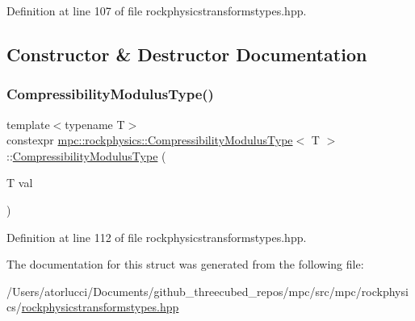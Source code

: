 Definition at line 107 of file rockphysicstransformstypes.\+hpp.



\subsection{Constructor \& Destructor Documentation}
\mbox{\label{structmpc_1_1rockphysics_1_1_compressibility_modulus_type_a7a8f465566c3f05f6bd9f24491680768}} 
\subsubsection{\texorpdfstring{Compressibility\+Modulus\+Type()}{CompressibilityModulusType()}}
{\footnotesize\ttfamily template$<$typename T$>$ \\
constexpr \mbox{\hyperlink{structmpc_1_1rockphysics_1_1_compressibility_modulus_type}{mpc\+::rockphysics\+::\+Compressibility\+Modulus\+Type}}$<$ T $>$\+::\mbox{\hyperlink{structmpc_1_1rockphysics_1_1_compressibility_modulus_type}{Compressibility\+Modulus\+Type}} (\begin{DoxyParamCaption}\item[{T}]{val }\end{DoxyParamCaption})\hspace{0.3cm}{\ttfamily [inline]}}



Definition at line 112 of file rockphysicstransformstypes.\+hpp.



The documentation for this struct was generated from the following file\+:\begin{DoxyCompactItemize}
\item 
/\+Users/atorlucci/\+Documents/github\+\_\+threecubed\+\_\+repos/mpc/src/mpc/rockphysics/\mbox{\hyperlink{rockphysicstransformstypes_8hpp}{rockphysicstransformstypes.\+hpp}}\end{DoxyCompactItemize}
